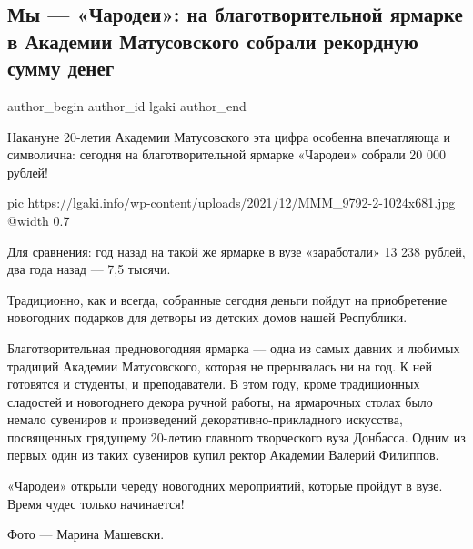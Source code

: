  
 
 
 
 
\subsection{Мы — «Чародеи»: на благотворительной ярмарке в Академии Матусовского собрали рекордную сумму денег}
\label{sec:15_12_2021.stz.edu.lnr.lgaki.1.charodei_jarmarka}

\ifcmt
 author_begin
   author_id lgaki
 author_end
\fi

Накануне 20-летия Академии Матусовского эта цифра особенна впечатляюща и
символична: сегодня на благотворительной ярмарке «Чародеи» собрали 20 000
рублей!

\ifcmt
  pic https://lgaki.info/wp-content/uploads/2021/12/MMM_9792-2-1024x681.jpg
  @width 0.7
\fi

Для сравнения: год назад на такой же ярмарке в вузе «заработали» 13 238 рублей,
два года назад — 7,5 тысячи.

Традиционно, как и всегда, собранные сегодня деньги пойдут на приобретение
новогодних подарков для детворы из детских домов нашей Республики. 


Благотворительная предновогодняя ярмарка — одна из самых давних и любимых
традиций Академии Матусовского, которая не прерывалась ни на год. К ней
готовятся и студенты, и преподаватели. В этом году, кроме традиционных
сладостей и новогоднего декора ручной работы, на ярмарочных столах было немало
сувениров и произведений декоративно-прикладного искусства, посвященных
грядущему 20-летию главного творческого вуза Донбасса. Одним из первых один из
таких сувениров купил ректор Академии Валерий Филиппов.


«Чародеи» открыли череду новогодних мероприятий, которые пройдут в вузе. Время
чудес только начинается!

Фото — Марина Машевски.


